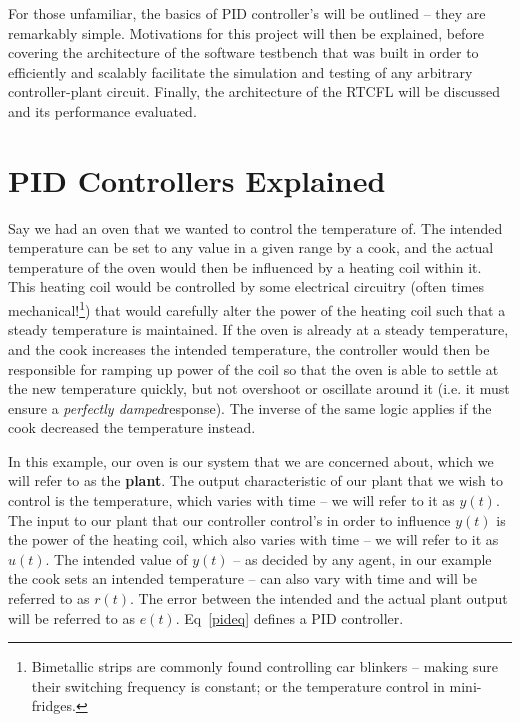 \documentclass[10pt,twocolumn,letterpaper]{article}
\begin{document}
        For those unfamiliar, the basics of PID controller's will be outlined -- they are remarkably simple. Motivations
        for this project will then be explained, before covering the architecture of the software testbench that was
        built in order to efficiently and scalably facilitate the simulation and testing of any arbitrary
        controller-plant circuit. Finally, the architecture of the RTCFL will be discussed and its performance
        evaluated.

    \section{PID Controllers Explained} \label{pidexplained}

        Say we had an oven that we wanted to control the temperature of. The intended temperature can be set to any
        value in a given range by a cook, and the actual temperature of the oven would then be influenced by a heating
        coil within it. This heating coil would be controlled by some electrical circuitry (often times
        mechanical!\footnote{Bimetallic strips are commonly found controlling car blinkers -- making sure their
        switching frequency is constant; or the temperature control in mini-fridges.}) that would carefully alter the
        power of the heating coil such that a steady temperature is maintained. If the oven is already at a steady
        temperature, and the cook increases the intended temperature, the controller would then be responsible for
        ramping up power of the coil so that the oven is able to settle at the new temperature quickly, but not
        overshoot or oscillate around it (i.e. it must ensure a \textit{perfectly damped}\footnotemark[1] response). The
        inverse of the same logic applies if the cook decreased the temperature instead.

        In this example, our oven is our system that we are concerned about, which we will refer to as the
        \textbf{plant}. The output characteristic of our plant that we wish to control is the temperature, which varies
        with time -- we will refer to it as $y(t)$. The input to our plant that our controller control's in order to
        influence $y(t)$ is the power of the heating coil, which also varies with time -- we will refer to it as $u(t)$.
        The intended value of $y(t)$ -- as decided by any agent, in our example the cook sets an intended temperature --
        can also vary with time and will be referred to as $r(t)$. The error between the intended and the actual plant
        output will be referred to as $e(t)$. Eq~\ref{pideq} defines a PID controller.
        
\end{document}
